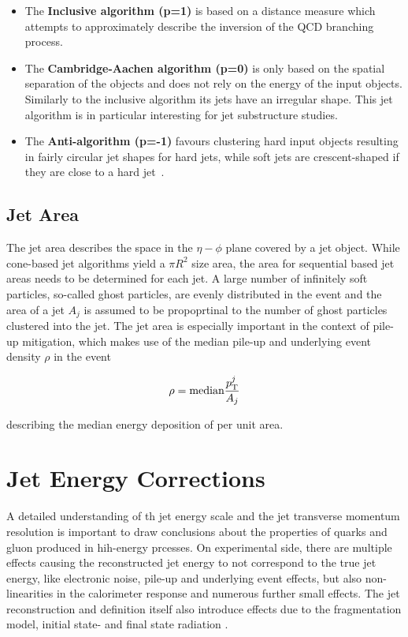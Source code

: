 \begin{itemize}
    \item The \textbf{Inclusive \kt algorithm (p=1)} is based on a \ptsq
        distance measure which attempts to approximately describe the inversion
        of the QCD branching process.
    \item The \textbf{Cambridge-Aachen algorithm (p=0)} is only based on the
        spatial separation of the objects and does not rely on the energy of
        the input objects. Similarly to the inclusive \kt algorithm its jets
        have an irregular shape. This jet algorithm is in particular interesting
        for jet substructure studies.
    \item The \textbf{Anti-\kt algorithm (p=-1)} favours clustering hard input
        objects resulting in fairly circular jet shapes for hard jets, while
        soft jets are crescent-shaped if they are close to a hard jet~\cite{Cacciari:2008gp}.
\end{itemize}

\subsection{Jet Area}

The jet area describes the space in the $\eta-\phi$ plane covered by a jet
object. While cone-based jet algorithms yield a $\pi R^2$ size area, the area
for sequential based jet areas needs to be determined for each jet. A large
number of infinitely soft particles, so-called ghost particles, are evenly
distributed in the event and the area of a jet $A_j$ is assumed to be propoprtinal to the
number of ghost particles clustered into the jet. The jet area is
especially important in the context of pile-up mitigation, which makes use of
the median pile-up and underlying event \pt density $\rho$ in the event 

\begin{equation}
    \rho = \text{median} \frac{p_{\mathrm{T}}^j}{A_j}
\end{equation}

describing the median energy deposition of per unit area.

\section{Jet Energy Corrections}

A detailed understanding of th jet energy scale and the jet transverse momentum
resolution is important to draw conclusions about the properties of quarks and
gluon produced in hih-energy prcesses. On experimental side, there are multiple
effects causing the reconstructed jet energy to not correspond to the true jet
energy, like electronic noise, pile-up and underlying event effects, but also
non-linearities in the calorimeter response and numerous further small effects.
The jet reconstruction and definition itself also introduce effects due to the
fragmentation model, initial state- and final state radiation \etc. 

